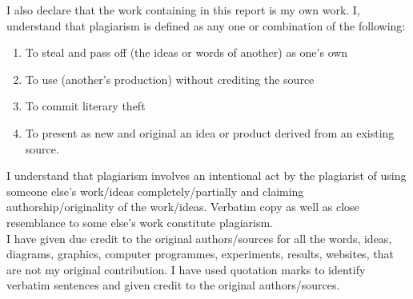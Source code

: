 \documentclass[12pt,a4paper]{article}
\begin{document}
\noindent I also declare that the work containing in this report is my own work. I, understand that plagiarism is defined as any one or combination of the following:
\begin{enumerate}
\item To steal and pass off (the ideas or words of another) as one's own
\item To use (another's production) without crediting the source
\item To commit literary theft
\item To present as new and original an idea or product derived from an existing source.
\end{enumerate}
I understand that plagiarism involves an intentional act by the plagiarist of using someone else's work/ideas completely/partially and claiming authorship/originality of the work/ideas. Verbatim copy as well as close resemblance to some else's work constitute plagiarism.\\

\noindent I have given due credit to the original authors/sources for all the words, ideas, diagrams, graphics, computer programmes, experiments, results, websites, that are not my original contribution. I have used quotation marks to identify verbatim sentences and given credit to the original authors/sources.\\
\end{document}
